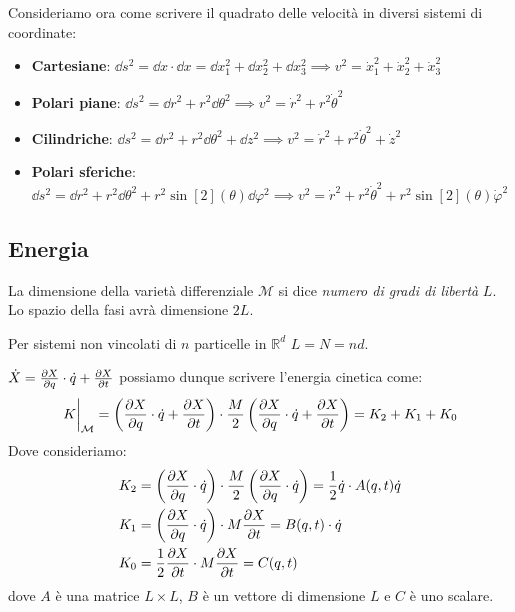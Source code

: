 Consideriamo ora come scrivere il quadrato delle velocità in diversi sistemi di coordinate:
\begin{itemize}
    \item \textbf{Cartesiane}: $\dd{s^2}= \dd{x}\cdot\dd{x}= \dd{x_1^2}+\dd{x_2^2}+\dd{x_3^2}\implies v^2= \dot{x}_1^2+\dot{x}_2^2+\dot{x}_3^2$
    \item \textbf{Polari piane}: $\dd{s^2}= \dd{r^2}+r^2\dd{\theta^2}\implies v^2=\dot{r}^2+r^2\dot{\theta}^2$
    \item \textbf{Cilindriche}: $\dd{s^2}= \dd{r^2}+r^2\dd{\theta^2}+\dd{z^2}\implies v^2= \dot{r}^2+r^2\dot{\theta}^2+\dot{z}^2$
    \item \textbf{Polari sferiche}: $\dd{s^2}= \dd{r^2}+r^2\dd{\theta^2}+r^2\sin[2](\theta)\dd{\varphi^2}\implies v^2 = \dot{r}^2+r^2\dot{\theta}^2+r^2\sin[2](\theta)\dot{\varphi}^2$
\end{itemize}


\subsection{Energia}

\begin{definition}
    La dimensione della varietà differenziale $\mathcal{M}$ si dice \textit{numero di gradi di libertà} $L$. Lo spazio della fasi avrà dimensione $2L$.
\end{definition}
Per sistemi non vincolati di $n $ particelle in $\mathbb{R}^d$ $L = N = nd$.

\begin{remark}
    $\dot{X}= \pdv{X}{q}\cdot \dot{q}+ \pdv{X}{t}$ possiamo dunque scrivere l'energia cinetica come:
    \begin{equation}
        \eval{K}_{\mathcal{M}}= \left( \pdv{X}{q}\cdot \dot{q}+ \pdv{X}{t} \right)\cdot \frac{M}{2}\left( \pdv{X}{q}\cdot \dot{q}+ \pdv{X}{t} \right)= K_2+K_1+K_0
    \end{equation}
    Dove consideriamo:
    \begin{align}
    K_2 &= \left( \pdv{X}{q}\cdot \dot{q} \right)\cdot \frac{M}{2}\left( \pdv{X}{q}\cdot \dot{q} \right)= \frac{1}{2}\dot{q}\cdot A(q,t)\dot{q}\\
    K_1 &= \left( \pdv{X}{q}\cdot \dot{q} \right)\cdot M\pdv{X}{t}=B(q,t)\cdot \dot{q}\\
    K_0 &= \frac{1}{2}\pdv{X}{t}\cdot M\pdv{X}{t}= C (q,t) 
    \end{align}
    dove $A$ è una matrice $L\times L $, $B $ è un vettore di dimensione $L $ e $C $ è uno scalare.
\end{remark}

